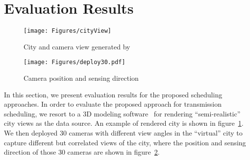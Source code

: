 \section{Evaluation Results}
\label{sec::evaluation}
%
\begin{figure}
\begin{center}
\texttt{[image: Figures/cityView]}
\caption{\label{fig::cityView}City and camera view generated by~\cite{Suicidator,Blender}}
\end{center}
\end{figure}
%
\begin{figure}
\begin{center}
\texttt{[image: Figures/deploy30.pdf]}
\caption{\label{fig::deploy30}Camera position and sensing direction}
\end{center}
\end{figure}
%
In this section, we present evaluation results for the proposed scheduling approaches.
In order to evaluate the proposed approach for transmission scheduling, we resort to a 3D modeling software~\cite{Suicidator,Blender} for rendering ``semi-realistic'' city views as the data source.
An example of rendered city is shown in figure~\ref{fig::cityView}.
We then deployed 30 cameras with different view angles in the ``virtual'' city to capture different but correlated views of the city, where the position and sensing direction of those 30 cameras are shown in figure~\ref{fig::deploy30}.


